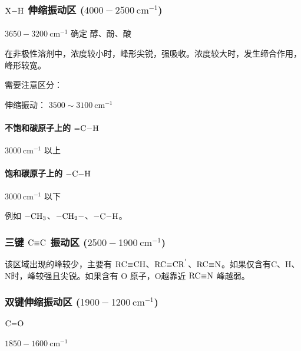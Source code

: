\subsubsection{$\ce{X-H}$ 伸缩振动区 ($4000 - 2500 \ \mathrm{cm}^{-1}$)}


\paragraph{} $3650 - 3200 \ \mathrm{cm}^{-1}$ 确定 醇、酚、酸

在非极性溶剂中，浓度较小时，峰形尖锐，强吸收。浓度较大时，发生缔合作用，峰形较宽。

需要注意区分：

 伸缩振动： $3500 \sim 3100 \ \mathrm{cm}^{-1}$

\vspace{0.5em}


\paragraph{不饱和碳原子上的 $\ce{=C-H}$}

$3000 \ \mathrm{cm}^{-1}$ 以上

\paragraph{饱和碳原子上的 $\ce{-C-H}$}

$3000 \ \mathrm{cm}^{-1}$ 以下

例如 $\ce{-CH3}$、$\ce{-CH2-}$、$\ce{-C-H}$。

\subsubsection{三键 $\ce{C#C}$ 振动区 ($2500 - 1900 \ \mathrm{cm}^{-1}$)}

该区域出现的峰较少，主要有 $\ce{RC#CH}$、$\ce{RC#CR^'}$、$\ce{RC#N}$。如果仅含有C、H、N时，峰较强且尖锐。如果含有 O  原子，O越靠近 $\ce{RC#N}$ 峰越弱。


\subsubsection{双键伸缩振动区 ($1900 - 1200 \ \mathrm{cm}^{-1}$)}

\paragraph{$\ce{C=O}$} $1850 - 1600 \ \mathrm{cm}^{-1}$

